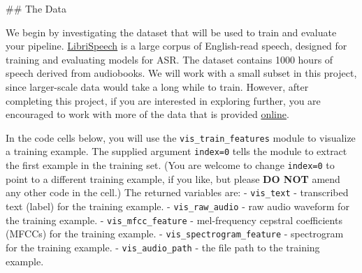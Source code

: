 \documentclass[11pt]{article}
\begin{document}
 \#\# The Data

We begin by investigating the dataset that will be used to train and
evaluate your pipeline.
\href{http://www.danielpovey.com/files/2015_icassp_librispeech.pdf}{LibriSpeech}
is a large corpus of English-read speech, designed for training and
evaluating models for ASR. The dataset contains 1000 hours of speech
derived from audiobooks. We will work with a small subset in this
project, since larger-scale data would take a long while to train.
However, after completing this project, if you are interested in
exploring further, you are encouraged to work with more of the data that
is provided \href{http://www.openslr.org/12/}{online}.

In the code cells below, you will use the \texttt{vis\_train\_features}
module to visualize a training example. The supplied argument
\texttt{index=0} tells the module to extract the first example in the
training set. (You are welcome to change \texttt{index=0} to point to a
different training example, if you like, but please \textbf{DO NOT}
amend any other code in the cell.) The returned variables are: -
\texttt{vis\_text} - transcribed text (label) for the training example.
- \texttt{vis\_raw\_audio} - raw audio waveform for the training
example. - \texttt{vis\_mfcc\_feature} - mel-frequency cepstral
coefficients (MFCCs) for the training example. -
\texttt{vis\_spectrogram\_feature} - spectrogram for the training
example. - \texttt{vis\_audio\_path} - the file path to the training
example.
\end{document}
